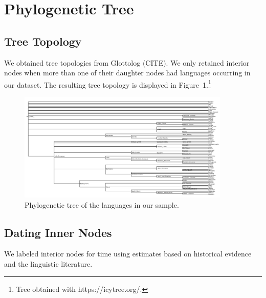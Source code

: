 \documentclass[11pt,a4paper]{article}
\begin{document}
\section{Phylogenetic Tree}

\subsection{Tree Topology}

We obtained tree topologies from Glottolog (CITE).
We only retained interior nodes when more than one of their daughter nodes had languages occurring in our dataset.
The resulting tree topology is displayed in Figure~\ref{fig:tree}.\footnote{Tree obtained with https://icytree.org/.}


\begin{figure}
    \centering
	\includegraphics[width=0.9\textwidth]{../trees/tree.png}
       \caption{Phylogenetic tree of the languages in our sample.}
    \label{fig:tree}
\end{figure}




\subsection{Dating Inner Nodes}
We labeled interior nodes for time using estimates based on historical evidence and the linguistic literature.
\end{document}
